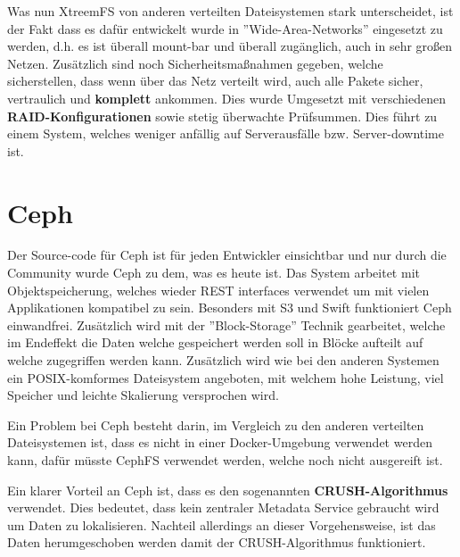Was nun XtreemFS von anderen verteilten Dateisystemen stark unterscheidet, ist der Fakt dass es dafür entwickelt wurde in ''Wide-Area-Networks'' eingesetzt zu werden, d.h. es ist überall mount-bar und überall zugänglich, auch in sehr großen Netzen. Zusätzlich sind noch Sicherheitsmaßnahmen gegeben, welche sicherstellen, dass wenn über das Netz verteilt wird, auch alle Pakete sicher, vertraulich und \textbf{komplett} ankommen. Dies wurde Umgesetzt mit verschiedenen \textbf{RAID-Konfigurationen} sowie stetig überwachte Prüfsummen. Dies führt zu einem System, welches weniger anfällig auf Serverausfälle bzw. Server-downtime ist. \cite{XtreemFSa}


\section{Ceph}
Der Source-code für Ceph ist für jeden Entwickler einsichtbar und nur durch die Community wurde Ceph zu dem, was es heute ist. Das System arbeitet mit Objektspeicherung, welches wieder REST interfaces verwendet um mit vielen Applikationen kompatibel zu sein. Besonders mit S3 und Swift funktioniert Ceph einwandfrei. Zusätzlich wird mit der ''Block-Storage'' Technik gearbeitet, welche im Endeffekt die Daten welche gespeichert werden soll in Blöcke aufteilt auf welche zugegriffen werden kann. Zusätzlich wird wie bei den anderen Systemen ein POSIX-komformes Dateisystem angeboten, mit welchem hohe Leistung, viel Speicher und leichte Skalierung versprochen wird.\cite{Ceph}

Ein Problem bei Ceph besteht darin, im Vergleich zu den anderen verteilten Dateisystemen ist, dass es nicht in einer Docker-Umgebung verwendet werden kann, dafür müsste CephFS verwendet werden, welche noch nicht ausgereift ist. \cite{Feriante}

Ein klarer Vorteil an Ceph ist, dass es den sogenannten \textbf{CRUSH-Algorithmus} verwendet. Dies bedeutet, dass kein zentraler Metadata Service gebraucht wird um Daten zu lokalisieren. Nachteil allerdings an dieser Vorgehensweise, ist das Daten herumgeschoben werden damit der CRUSH-Algorithmus funktioniert. \cite{Yehorov}
